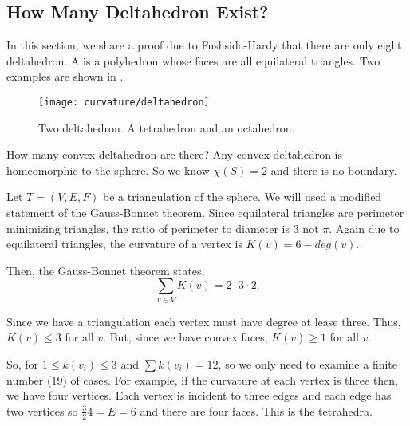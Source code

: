 \subsection{How Many Deltahedron Exist?}
\label{sec:deltahedron}

In this section, we share a proof due to
Fushsida-Hardy \cite{deltahedron} that there are
only eight deltahedron.
A  is a polyhedron whose
faces are all equilateral triangles. Two examples are shown
in .


\begin{figure}[htb]
\centering
\texttt{[image: curvature/deltahedron]}
\caption{Two deltahedron. A tetrahedron and an octahedron.}
\label{fig:deltahedron}
\end{figure}

How many convex deltahedron are there?
Any convex deltahedron is homeomorphic to the sphere.
So we know $\chi(S)=2$ and there is no boundary.

Let $T=(V,E,F)$  be a triangulation of the sphere.
We will used a modified statement of the Gauss-Bonnet theorem.
Since equilateral triangles are perimeter minimizing triangles,
the ratio of perimeter to diameter is $3$ not $\pi$.
Again due to equilateral triangles, the curvature of a vertex
is $K(v)=6-deg(v).$

Then, the Gauss-Bonnet theorem
states,
$$\sum_{v\in V}K(v)=2\cdot  3\cdot 2.$$

Since we have a triangulation each
vertex must have degree at lease three.
Thus, $K(v)\leq 3$ for all $v$. But, since we have
convex faces, $K(v)\geq 1$ for all $v$.

So, for $1\leq k(v_i)\leq 3$ and  $\sum k(v_i)=12$,
so we only need to examine a finite number (19) of cases.
For example, if the curvature at each vertex is three then,
we have four vertices. Each vertex is incident to three edges
and each edge has two vertices so $\frac{3}{2}4=E=6$ and
there are four faces. This is the tetrahedra.




